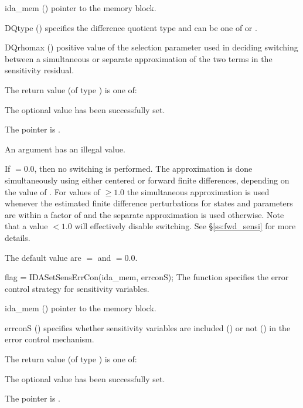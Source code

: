 {
  \begin{args}
  \item[ida\_mem] ()
    pointer to the {\idas} memory block.
  \item[DQtype] ()
    specifies the difference quotient type and can be one of 
    or .
  \item[DQrhomax] ()
    positive value of the selection parameter used in deciding switching between a simultaneous
    or separate approximation of the two terms in the sensitivity residual.
  \end{args}
}
{
  The return value  (of type ) is one of:
  \begin{args}
  \item[\Id{IDA\_SUCCESS}]
    The optional value has been successfully set.
  \item[\Id{IDA\_MEM\_NULL}]
    The  pointer is .
  \item[\Id{IDA\_ILL\_INPUT}]
    An argument has an illegal value.
  \end{args}
}
{
  If  $= 0.0$, then no switching is performed. The approximation is done simultaneously
  using either centered or forward finite differences, depending on the value of . 
  For values of  $\ge 1.0$ the simultaneous approximation is used whenever the 
  estimated finite difference perturbations for states and parameters are within a factor of
   and the separate approximation is used otherwise. Note that a value 
   $< 1.0$ will effectively disable switching.   
  See \S\ref{ss:fwd_sensi} for more details.

  The default value are $=$ and $=0.0$. 
}
{
  flag = IDASetSensErrCon(ida\_mem, errconS);
}
{
  The function  specifies the error control
  strategy for sensitivity variables.
}
{
  \begin{args}
  \item[ida\_mem] ()
    pointer to the {\idas} memory block.
  \item[errconS] ()
    specifies whether sensitivity variables are included () or not
    () in the error control mechanism.
  \end{args}
}
{
  The return value  (of type ) is one of:
  \begin{args}
  \item[\Id{IDA\_SUCCESS}] 
    The optional value has been successfully set.
  \item[\Id{IDA\_MEM\_NULL}]
    The  pointer is .
  \end{args}
}
